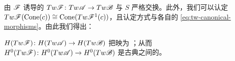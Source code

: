 由 \trAFunctor{} $\mathscr{F}$ 诱导的\trFunctor{} $Tw\mathscr{F}\colon Tw\mathscr{A}\to Tw\mathscr{B}$
与 $S$ 严格交换。此外，我们可以认定
$Tw\mathscr{F}(\mathrm{Cone}(c))\cong\mathrm{Cone}(Tw\mathscr{F}^1(c))$，且认定方式与各自的%
\trMorphism{} \eqref{eq:tw-canonical-morphisms}\trCompatible。由此我们得出：

\begin{lemma}\label{thm:tw-functor-preserves-triangles}
$H(Tw\mathscr{F})\colon H(Tw\mathscr{A})\to H(Tw\mathscr{B})$ 把\trExactTriangle{}映为%
\trExactTriangle；从而 $H^0(Tw\mathscr{F})\colon H^0(Tw\mathscr{A})\to H^0(Tw\mathscr{B})$
是古典\trTriangulated\trCategory{}之间的\trExact{}\trFunctor。
\noqed
\end{lemma}
